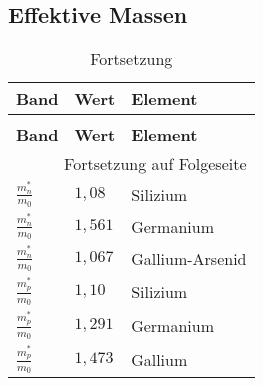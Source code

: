 \documentclass[12pt,a4paper]{report}%
\numberwithin{equation}{section}
\begin{document}
	\subsection{Effektive Massen} \label{ch:don/acc}
	\renewcommand{\arraystretch}{1.5}
	\begin{longtable} {|p{2cm}|p{3cm}|p{8.4cm}|} \hline
	\textbf{Band} & \textbf{Wert} & \textbf{Element} \\
	\hline
	\endfirsthead %
	\caption{Fortsetzung}\\ \hline
	\textbf{Band} & \textbf{Wert} & \textbf{Element} \\
	\hline
	\endhead %
	\multicolumn{3}{r}{Fortsetzung auf Folgeseite}\\
	\endfoot
	\hline
	\endlastfoot
	$\frac{m_n^*}{m_0}$ & $1,08$ & Silizium \\ \hline
	$\frac{m_n^*}{m_0}$ & $1,561$ & Germanium \\ \hline
	$\frac{m_n^*}{m_0}$ & $1,067$ & Gallium-Arsenid \\ \hline
	$\frac{m_p^*}{m_0}$ & $1,10$ & Silizium \\ \hline
	$\frac{m_p^*}{m_0}$ & $1,291$ & Germanium \\ \hline
	$\frac{m_p^*}{m_0}$ & $1,473$ & Gallium \\ \hline
	\end{longtable}
	\renewcommand{\arraystretch}{1}
	
\end{document}
